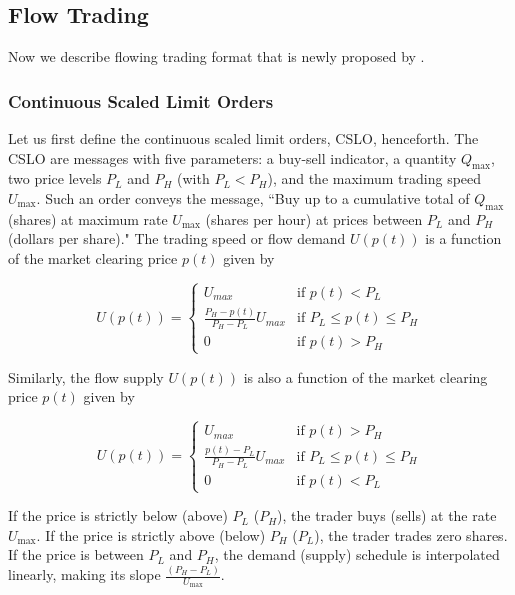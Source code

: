 \subsection{Flow Trading}

Now we describe flowing trading format that is newly proposed by \cite{flow}.

\subsubsection{Continuous Scaled Limit Orders}
Let us first define the continuous scaled limit orders, CSLO, henceforth. The CSLO are messages with five parameters: a buy-sell indicator, a quantity $Q_{\max}$, two price levels $P_L$ and $P_H$ (with $P_L < P_H$), and the maximum trading speed $U_{\max}$. Such an order conveys the message, ``Buy up to a cumulative total of $Q_{\max}$ (shares) at maximum rate $U_{\max}$ (shares per hour) at prices between $P_L$ and $P_H$ (dollars per share)." The trading speed or flow demand $U(p(t))$ is a function of the market clearing price $p(t)$ given by 

$$U(p(t)) = \begin{cases}
	U_{max} & \text{if } p(t) < P_L \\
	\frac{P_H - p(t)}{P_H - P_L} U_{max} & \text{if } P_L \leq p(t) \leq P_H \\
	0 & \text{if } p(t) > P_H
\end{cases}$$

Similarly, the flow supply $U(p(t))$ is also a function of the market clearing price $p(t)$ given by 

$$U(p(t)) = \begin{cases}
	U_{max} & \text{if } p(t) > P_H\\
	\frac{p(t) - P_L}{P_H - P_L} U_{max} & \text{if } P_L \leq p(t) \leq P_H \\
	0 & \text{if } p(t) < P_L 
\end{cases}$$

If the price is strictly below (above) $P_L$ ($P_H$), the trader buys (sells) at the rate $U_{\max}$. If the price is strictly above (below) $P_H$ ($P_L$), the trader trades zero shares. If the price is between $P_L$ and $P_H$, the demand (supply) schedule is interpolated linearly, making its slope $\frac{(P_H - P_L)}{U_{\max}}$. 


